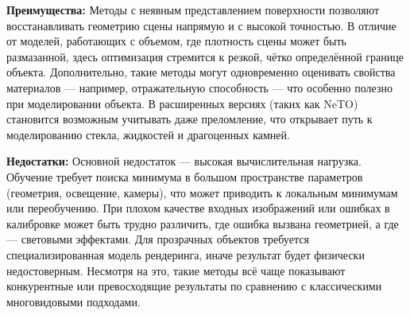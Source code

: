 \textbf{Преимущества:} Методы с неявным представлением поверхности позволяют
восстанавливать геометрию сцены напрямую и с высокой точностью. В отличие от
моделей, работающих с объемом, где плотность сцены может быть размазанной, здесь
оптимизация стремится к резкой, чётко определённой границе объекта.
Дополнительно, такие методы могут одновременно оценивать свойства материалов —
например, отражательную способность — что особенно полезно при моделировании
объекта. В расширенных версиях (таких как NeTO) становится возможным учитывать
даже преломление, что открывает путь к моделированию стекла, жидкостей и
драгоценных камней.

\textbf{Недостатки:} Основной недостаток — высокая вычислительная нагрузка.
Обучение требует поиска минимума в большом пространстве параметров (геометрия,
освещение, камеры), что может приводить к локальным минимумам или переобучению.
При плохом качестве входных изображений или ошибках в калибровке
может быть трудно различить, где ошибка вызвана геометрией, а где — световыми
эффектами. Для прозрачных объектов требуется специализированная модель
рендеринга, иначе результат будет физически недостоверным. Несмотря на это,
такие методы всё чаще показывают конкурентные или превосходящие результаты по
сравнению с классическими многовидовыми подходами.

